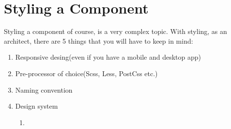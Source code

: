 \maketitle{}
\section{ Styling a Component }

Styling a component of course, is a very complex topic. With styling, as an
architect, there are 5 things that you will have to keep in mind:
\begin{enumerate}
  \item Responsive desing(even if you have a mobile and desktop app)
  \item Pre-processor of choice(Scss, Less, PostCss etc.)
  \item Naming convention
  \item Design system
    \begin{enumerate}
      \item
    \end{enumerate}

\end{enumerate}
